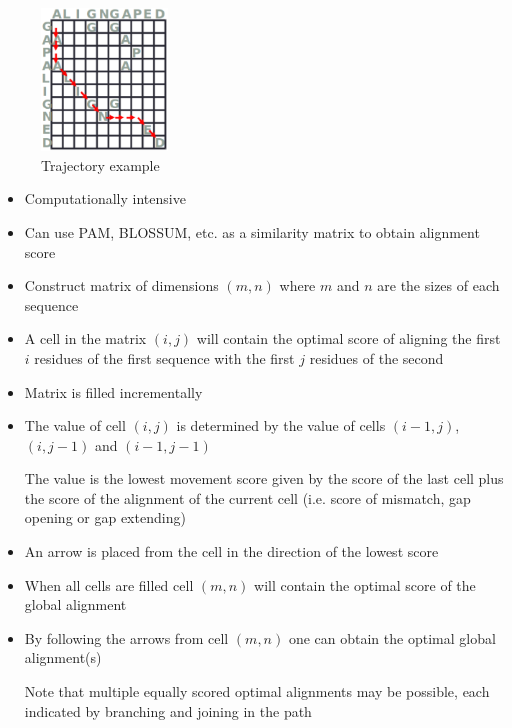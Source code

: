 \documentclass[a4paper]{article}
\begin{document}
\begin{figure}[h!]
  \centering
  \includegraphics[width=0.3\textwidth]{graphics/alignment_trajectory.eps}
  \caption{Trajectory example}
  \label{fig:alignment_trajectory}
\end{figure}
\FloatBarrier


\begin{itemize}
  \item
    Computationally intensive

  \item
    Can use PAM, BLOSSUM, etc. as a similarity matrix to obtain alignment score

  \item
    Construct matrix of dimensions $(m, n)$ where $m$ and $n$ are the sizes of
    each sequence

  \item
    A cell in the matrix $(i, j)$ will contain the optimal score of aligning the
    first $i$ residues of the first sequence with the first $j$ residues of the
    second

  \item
    Matrix is filled incrementally

  \item
    The value of cell $(i, j)$ is determined by the value of cells $(i-1, j)$,
    $(i, j-1)$ and $(i-1, j-1)$

    The value is the lowest movement score given by the score of the last cell
    plus the score of the alignment of the current cell (i.e. score of mismatch,
    gap opening or gap extending)

  \item
    An arrow is placed from the cell in the direction of the lowest score

  \item
    When all cells are filled cell $(m, n)$ will contain the optimal score of
    the global alignment

  \item
    By following the arrows from cell $(m, n)$ one can obtain the optimal global
    alignment(s)

    Note that multiple equally scored optimal alignments may be possible, each
    indicated by branching and joining in the path
\end{itemize}
\end{document}

